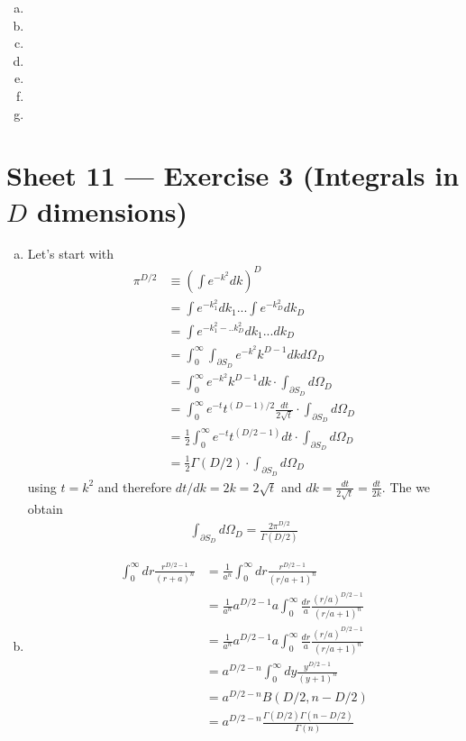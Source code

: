 \documentclass[10pt,a4paper]{report}
\theoremstyle{definition}
\begin{document}
\begin{enumerate}[(a)]
\item
\item
\item
\item
\item
\item
\item
\end{enumerate}



\newpage
\section{Sheet 11 — Exercise 3 (Integrals in $D$ dimensions)}
\begin{enumerate}[a)]
\item Let's start with 
\begin{align}
\pi^{D/2}
&\equiv\left(\int e^{-k^2}dk\right)^D\\
&=\int e^{-k_1^2}dk_1...\int e^{-k_D^2}dk_D\\
&=\int e^{-k_1^2-..k_D^2}dk_1...dk_D\\
&=\int_0^\infty\int_{\partial S_D} e^{-k^2}k^{D-1}dk d\Omega_D\\
&=\int_0^\infty e^{-k^2}k^{D-1}dk\cdot\int_{\partial S_D} d\Omega_D\\
&=\int_0^\infty e^{-t}t^{(D-1)/2}\frac{dt}{2\sqrt{t}}\cdot\int_{\partial S_D} d\Omega_D\\
&=\frac{1}{2}\int_0^\infty e^{-t}t^{(D/2-1)}dt\cdot\int_{\partial S_D} d\Omega_D\\
&=\frac{1}{2}\Gamma(D/2)\cdot\int_{\partial S_D} d\Omega_D
\end{align}
using $t=k^2$ and therefore $dt/dk=2k=2\sqrt{t}$ and $dk=\frac{dt}{2\sqrt{t}}=\frac{dt}{2k}$.
The we obtain
\begin{align}
\int_{\partial S_D} d\Omega_D=\frac{2\pi^{D/2}}{\Gamma(D/2)}
\end{align}

\item
\begin{align}
\int_0^\infty dr\frac{r^{D/2-1}}{(r+a)^n}
&=\frac{1}{a^n}\int_0^\infty dr\frac{r^{D/2-1}}{(r/a+1)^n}\\
&=\frac{1}{a^n}a^{D/2-1}a\int_0^\infty \frac{dr}{a}\frac{(r/a)^{D/2-1}}{(r/a+1)^n}\\
&=\frac{1}{a^n}a^{D/2-1}a\int_0^\infty \frac{dr}{a}\frac{(r/a)^{D/2-1}}{(r/a+1)^n}\\
&=a^{D/2-n}\int_0^\infty dy \frac{y^{D/2-1}}{(y+1)^n}\\
&=a^{D/2-n}B(D/2,n-D/2)\\
&=a^{D/2-n}\frac{\Gamma(D/2)\Gamma(n-D/2)}{\Gamma(n)}
\end{align}

\end{enumerate}
\end{document}
